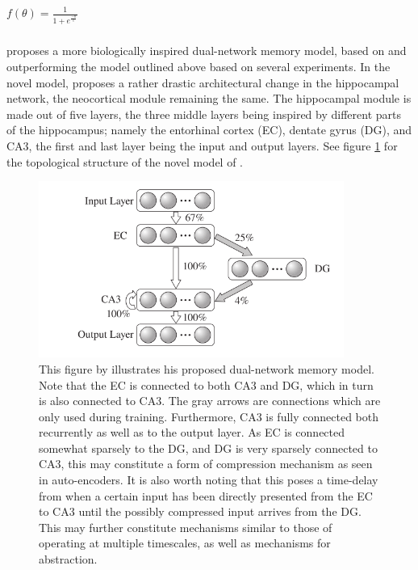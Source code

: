 \begin{center}
\begin{math}
    f(\theta) = \frac{1}{1 + e^{\frac{-\theta}{\epsilon}}}
\end{math}
\end{center}

\subsubsection{\cite{Hattori2014}}
\cite{Hattori2014} proposes a more biologically inspired dual-network memory model, based on and outperforming the model outlined above based on several experiments. In the novel model, \cite{Hattori2014} proposes a rather drastic architectural change in the hippocampal network, the neocortical module remaining the same. The hippocampal module is made out of five layers, the three middle layers being inspired by different parts of the hippocampus; namely the entorhinal cortex (EC), dentate gyrus (DG), and CA3, the first and last layer being the input and output layers. See figure \ref{fig:hattori_2014_model} for the topological structure of the novel model of \cite{Hattori2014}.

\begin{figure}
\centering
\includegraphics[width=10cm]{fig/hattori2014_hpc_module}
\caption{This figure by \cite{Hattori2014} illustrates his proposed dual-network memory model. Note that the EC is connected to both CA3 and DG, which in turn is also connected to CA3. The gray arrows are connections which are only used during training. Furthermore, CA3 is fully connected both recurrently as well as to the output layer. As EC is connected somewhat sparsely to the DG, and DG is very sparsely connected to CA3, this may constitute a form of compression mechanism as seen in auto-encoders. It is also worth noting that this poses a time-delay from when a certain input has been directly presented from the EC to CA3 until the possibly compressed input arrives from the DG. This may further constitute mechanisms similar to those of operating at multiple timescales, as well as mechanisms for abstraction.}
\label{fig:hattori_2014_model}
\end{figure}

